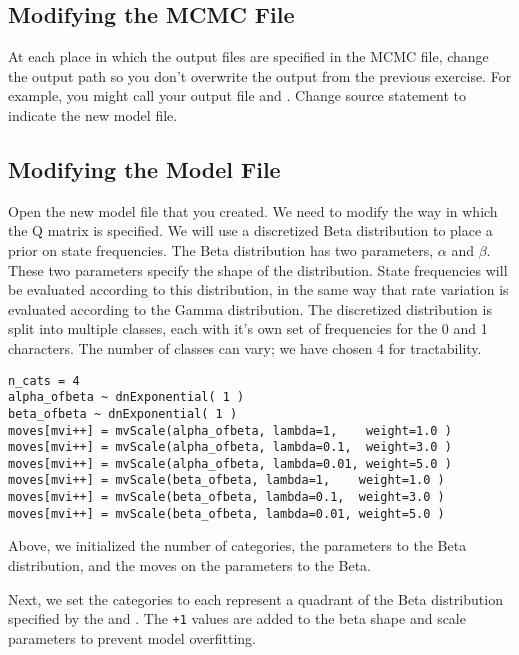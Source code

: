 \subsection{Modifying the MCMC File}

At each place in which the output files are specified in the MCMC file, change the output path so you don't overwrite the output from the previous exercise. 
For example, you might call your output file  and .
Change source statement to indicate the new model file.

\subsection{Modifying the Model File}

Open the new model file that you created. We need to modify the way in which the Q matrix is specified. 
We will use a discretized Beta distribution to place a prior on state frequencies. 
The Beta distribution has two parameters, $\alpha$ and $\beta$.
These two parameters specify the shape of the distribution.
State frequencies will be evaluated according to this distribution, in the same way that rate variation is evaluated according to the Gamma distribution. 
The discretized distribution is split into multiple classes, each with it's own set of frequencies for the 0 and 1 characters.
The number of classes can vary; we have chosen 4 for tractability.\par

{\tt \begin{snugshade*}
\begin{lstlisting}
n_cats = 4
alpha_ofbeta ~ dnExponential( 1 )
beta_ofbeta ~ dnExponential( 1 )
moves[mvi++] = mvScale(alpha_ofbeta, lambda=1,    weight=1.0 )
moves[mvi++] = mvScale(alpha_ofbeta, lambda=0.1,  weight=3.0 )
moves[mvi++] = mvScale(alpha_ofbeta, lambda=0.01, weight=5.0 )
moves[mvi++] = mvScale(beta_ofbeta, lambda=1,    weight=1.0 )
moves[mvi++] = mvScale(beta_ofbeta, lambda=0.1,  weight=3.0 )
moves[mvi++] = mvScale(beta_ofbeta, lambda=0.01, weight=5.0 )
\end{lstlisting}
\end{snugshade*}}

Above, we initialized the number of categories,  the parameters to the Beta distribution, and the moves on the parameters to the Beta. 

Next, we set the categories to each represent a quadrant of the Beta distribution specified by the  and . The {\tt +1} values are added to the beta shape and scale parameters to prevent model overfitting.

